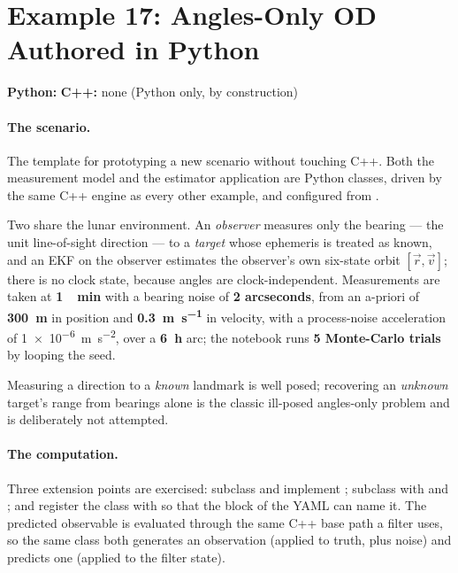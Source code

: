 \section{Example 17: Angles-Only OD Authored in Python}
\label{sec:tut-ex17}

\textbf{Python:}  \quad
\textbf{C++:} none (Python only, by construction)

\paragraph{The scenario.}
The template for prototyping a new scenario without touching C++. Both the
measurement model and the estimator application are Python classes, driven by
the same C++  engine as every other example, and configured
from .

Two  share the lunar environment. An \emph{observer} measures
only the bearing --- the unit line-of-sight direction --- to a \emph{target}
whose ephemeris is treated as known, and an EKF on the observer estimates the
observer's own six-state orbit $[\vec{r},\vec{v}]$; there is no clock state,
because angles are clock-independent. Measurements are taken at
\textbf{\SI{1}{\per\minute}} with a bearing noise of \textbf{2 arcseconds}, from
an a-priori of \textbf{\SI{300}{\meter}} in position and
\textbf{\SI{0.3}{\meter\per\second}} in velocity, with a process-noise
acceleration of \SI{1e-6}{\meter\per\second\squared}, over a
\textbf{\SI{6}{\hour}} arc; the notebook runs \textbf{5 Monte-Carlo trials} by
looping the seed.

Measuring a direction to a \emph{known} landmark is well posed; recovering an
\emph{unknown} target's range from bearings alone is the classic ill-posed
angles-only problem and is deliberately not attempted.

\paragraph{The computation.}
Three extension points are exercised: subclass  and
implement ; subclass  with
 and ; and register the class with
 so that the  block of the YAML
can name it. The predicted observable is evaluated through the same C++ base
path a filter uses, so the same class both generates an observation (applied to
truth, plus noise) and predicts one (applied to the filter state).

